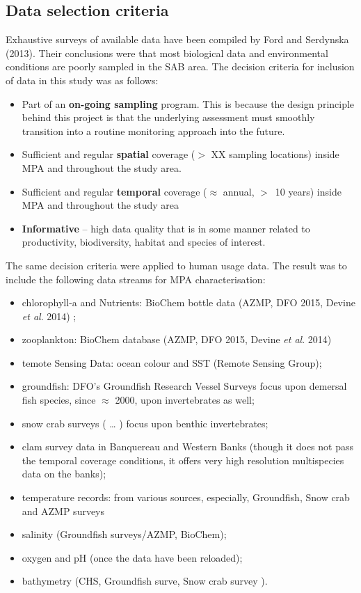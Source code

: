 \documentclass[letterpaper,portrait,11pt]{scrartcl}
\numberwithin{equation}{section}		%
\numberwithin{figure}{section}		%
\numberwithin{table}{section}				%
\begin{document}
\subsection{Data selection criteria}
Exhaustive surveys of available data have been compiled by Ford and Serdynska (2013). Their conclusions were that most biological data and environmental conditions are poorly sampled in the SAB area. The decision criteria for inclusion of data in this study was as follows:

\begin{itemize}
	\item Part of an \textbf{on-going sampling} program. This is because the design principle behind this project is that the underlying assessment must smoothly transition into a routine monitoring approach into the future.
  \item	Sufficient and regular \textbf{spatial} coverage ($>$ XX sampling locations) inside MPA and throughout the study area.
  \item Sufficient and regular \textbf{temporal} coverage ($\approx$ annual, $>$~10 years) inside MPA and throughout the study area
  \item \textbf{Informative} -- high data quality that is in some manner related to productivity, biodiversity, habitat and species of interest.
\end{itemize}

The same decision criteria were applied to human usage data. The result was to include the following data streams for MPA characterisation:

\begin{itemize}
	\item chlorophyll-a and Nutrients: BioChem bottle data (AZMP, DFO 2015, Devine \textit{et al}. 2014) ;
  \item zooplankton: BioChem database (AZMP, DFO 2015, Devine \textit{et al}. 2014) 
  \item temote Sensing Data: ocean colour and SST (Remote Sensing Group);
  \item groundfish: DFO's Groundfish Research Vessel Surveys focus upon demersal fish species, since $\approx$ 2000, upon invertebrates as well;
  \item snow crab surveys ( \ldots{} ) focus upon benthic invertebrates;
  \item clam survey data in Banquereau and Western Banks (though it does not pass the temporal coverage conditions, it offers very high resolution multispecies data on the banks);
  \item temperature records: from various sources, especially, Groundfish, Snow crab and AZMP surveys
  \item salinity (Groundfish surveys/AZMP, BioChem);
  \item oxygen and pH (once the data have been reloaded);
  \item bathymetry (CHS, Groundfish surve, Snow crab survey ).
\end{itemize}
\end{document}
